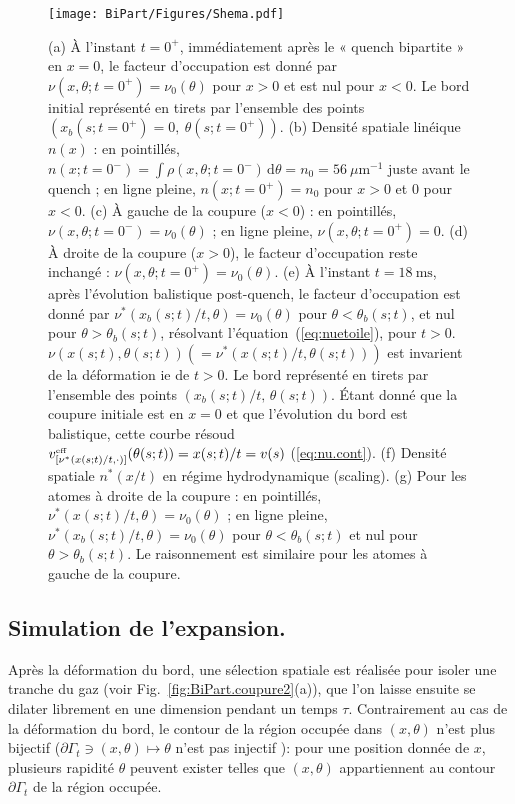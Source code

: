 \begin{figure}[!htb]
	\centering
	\texttt{[image: BiPart/Figures/Shema.pdf]}
	\caption{
(a) À l'instant $t = 0^+$, immédiatement après le « quench bipartite » en $x = 0$, le facteur d'occupation est donné par $\nu(x, \theta ; t = 0^+) = \nu_0(\theta)$ pour $x > 0$ et est nul pour $x < 0$. Le bord initial représenté en tirets par l'ensemble des points $(x_b(s; t = 0^+) = 0,\ \theta(s; t = 0^+))$.
(b) Densité spatiale linéique $n(x)$ : en pointillés, $n(x; t = 0^-) = \int \rho(x, \theta; t = 0^-) \, \mathrm{d}\theta = n_0 = 56~\mu\mathrm{m}^{-1}$ juste avant le quench ; en ligne pleine, $n(x; t = 0^+) = n_0$ pour $x > 0$ et $0$ pour $x < 0$.
(c) À gauche de la coupure ($x < 0$) : en pointillés, $\nu(x, \theta ; t = 0^-) = \nu_0(\theta)$ ; en ligne pleine, $\nu(x, \theta ; t = 0^+) = 0$.
(d) À droite de la coupure ($x > 0$), le facteur d'occupation reste inchangé : $\nu(x, \theta ; t = 0^+) = \nu_0(\theta)$.
(e) À l'instant $t = 18~\mathrm{ms}$, après l'évolution balistique post-quench, le facteur d'occupation est donné par $\nu^\ast(x_b(s;t)/t, \theta) = \nu_0(\theta)$ pour $\theta < \theta_b(s;t)$, et nul pour $\theta > \theta_b(s;t)$, résolvant l'équation~(\ref{eq:nuetoile}), pour $t>0$. $\nu(x(s;t), \theta(s;t))(=\nu^\ast(x(s;t)/t, \theta(s;t)))$ est invarient de la déformation ie de $t>0$.  Le bord représenté en tirets par l'ensemble des points $(x_b(s; t)/t,\, \theta(s; t))$. Étant donné que la coupure initiale est en $x = 0$ et que l’évolution du bord est balistique, cette courbe résoud $v^{\mbox{\tiny eff}}_{[\nu^\ast(x(s; t)/t, \cdot) ]}(\theta(s; t)) = x(s; t)/t = v(s)$ (\ref{eq:nu.cont}).
(f) Densité spatiale  $n^\ast(x/t)$ en régime hydrodynamique (scaling).
(g) Pour les atomes à droite de la coupure : en pointillés, $\nu^\ast(x(s;t)/t, \theta) = \nu_0(\theta)$ ; en ligne pleine, $\nu^\ast(x_b(s;t)/t, \theta) = \nu_0(\theta)$ pour $\theta < \theta_b(s;t)$ et nul pour $\theta > \theta_b(s;t)$. Le raisonnement est similaire pour les atomes à gauche de la coupure.
}
	\label{fig:BiPart.coupure1}
	
\end{figure}

\subsection{Simulation de l’expansion.}

Après la déformation du bord, une sélection spatiale est réalisée pour isoler une tranche du gaz (voir Fig.~\ref{fig:BiPart.coupure2}(a)), que l’on laisse ensuite se dilater librement en une dimension pendant un temps \(\tau\). Contrairement au cas de la déformation du bord, le contour de la région occupée dans $(x,\theta)$ n’est plus bijectif ($\partial \Gamma_t \ni (x,\theta) \mapsto \theta $ n'est pas injectif ): pour une position donnée de $x$, plusieurs rapidité $\theta$ peuvent exister telles que $(x,\theta)$ appartiennent au contour $\partial \Gamma_t$ de la région occupée.

